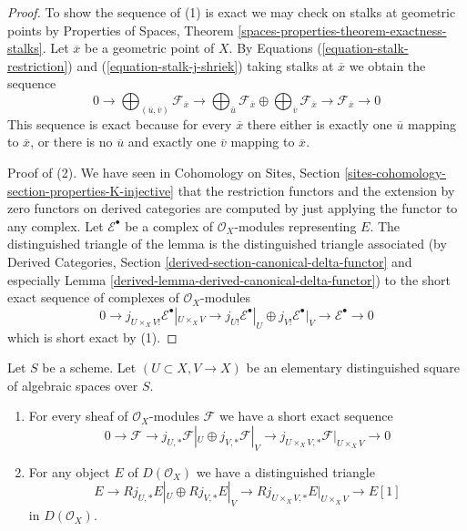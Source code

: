 \begin{proof}
To show the sequence of (1) is exact we may check on stalks at
geometric points by
Properties of Spaces, Theorem
\ref{spaces-properties-theorem-exactness-stalks}.
Let $\overline{x}$ be a geometric point of $X$. By Equations
(\ref{equation-stalk-restriction}) and (\ref{equation-stalk-j-shriek})
taking stalks at $\overline{x}$ we obtain the sequence
$$
0 \to
\bigoplus\nolimits_{(\overline{u}, \overline{v})} \mathcal{F}_{\overline{x}}
\to
\bigoplus\nolimits_{\overline{u}} \mathcal{F}_{\overline{x}}
\oplus
\bigoplus\nolimits_{\overline{v}} \mathcal{F}_{\overline{x}}
\to
\mathcal{F}_{\overline{x}} \to 0
$$
This sequence is exact because for every $\overline{x}$
there either is exactly one $\overline{u}$ mapping to $\overline{x}$,
or there is no $\overline{u}$ and exactly one $\overline{v}$
mapping to $\overline{x}$.

\medskip\noindent
Proof of (2). We have seen in Cohomology on Sites, Section
\ref{sites-cohomology-section-properties-K-injective}
that the restriction functors and the extension by zero functors
on derived categories are computed by just applying the functor
to any complex. Let $\mathcal{E}^\bullet$ be a complex
of $\mathcal{O}_X$-modules representing $E$.
The distinguished triangle of the lemma is the
distinguished triangle associated (by
Derived Categories, Section
\ref{derived-section-canonical-delta-functor} and especially
Lemma \ref{derived-lemma-derived-canonical-delta-functor})
to the short exact sequence of complexes of $\mathcal{O}_X$-modules
$$
0 \to j_{U \times_X V!}\mathcal{E}^\bullet|_{U \times_X V} \to
j_{U!}\mathcal{E}^\bullet|_U \oplus j_{V!}\mathcal{E}^\bullet|_V
\to \mathcal{E}^\bullet \to 0
$$
which is short exact by (1).
\end{proof}

\begin{lemma}
\label{lemma-exact-sequence-j-star}
Let $S$ be a scheme. Let $(U \subset X, V \to X)$ be an elementary
distinguished square of algebraic spaces over $S$.
\begin{enumerate}
\item For every sheaf of $\mathcal{O}_X$-modules $\mathcal{F}$
we have a short exact sequence
$$
0 \to \mathcal{F} \to
j_{U, *}\mathcal{F}|_U \oplus j_{V, *}\mathcal{F}|_V \to
j_{U \times_X V, *}\mathcal{F}|_{U \times_X V} \to 0
$$
\item For any object $E$ of $D(\mathcal{O}_X)$ we have a distinguished
triangle
$$
E \to 
Rj_{U, *}E|_U \oplus Rj_{V, *}E|_V \to
Rj_{U \times_X V, *}E|_{U \times_X V} \to
E[1]
$$
in $D(\mathcal{O}_X)$.
\end{enumerate}
\end{lemma}

